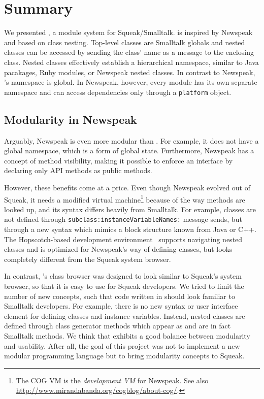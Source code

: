 \chapter{Summary}
\label{sec:summary}
We presented \msname, a module system for Squeak/Smalltalk. \msname is inspired by Newspeak and based on class nesting. Top-level classes are Smalltalk globals and nested classes can be accessed by sending the class' name as a message to the enclosing class. Nested classes effectively establish a hierarchical namespace, similar to Java pacakages, Ruby modules, or Newspeak nested classes. In contrast to Newspeak, \msname's namespace is global. In Newspeak, however, every module has its own separate namespace and can access dependencies only through a \texttt{platform} object.

\section{Modularity in Newspeak}
Arguably, Newspeak is even more modular than \msname. For example, it does not have a global namespace, which is a form of global state. Furthermore, Newspeak has a concept of method visibility, making it possible to enforce an interface by declaring only API methods as public methods. 

However, these benefits come at a price. Even though Newspeak evolved out of Squeak, it needs a modified virtual machine\footnote{The COG VM is the \emph{development VM} for Newspeak. See also \url{http://www.mirandabanda.org/cogblog/about-cog/}.} because of the way methods are looked up, and its syntax differs heavily from Smalltalk. For example, classes are not defined through \texttt{subclass:instanceVariableNames:} message sends, but through a new syntax which mimics a block structure known from Java or C++. The Hopscotch-based development environment~\cite{Bykov08hopscotch:towards} supports navigating nested classes and is optimized for Newspeak's way of defining classes, but looks completely different from the Squeak system browser. 

In contrast, \msname's class browser was designed to look similar to Squeak's system browser, so that it is easy to use for Squeak developers. We tried to limit the number of new concepts, such that code written in \msname should look familiar to Smalltalk developers. For example, there is no new syntax or user interface element for defining classes and instance variables. Instead, nested classes are defined through class generator methods which appear as and are in fact Smalltalk methods. We think that \msname exhibits a good balance between modularity and usability. After all, the goal of this project was not to implement a new modular programming language but to bring modularity concepts to Squeak.

